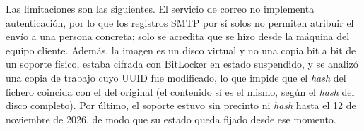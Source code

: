 Las limitaciones son las siguientes. El servicio de correo no implementa
autenticación, por lo que los registros SMTP por sí solos no permiten atribuir
el envío a una persona concreta; solo se acredita que se hizo desde la máquina
del equipo cliente. Además, la imagen es un disco virtual y no una copia bit a
bit de un soporte físico, estaba cifrada con BitLocker en estado suspendido, y
se analizó una copia de trabajo cuyo UUID fue modificado, lo que impide que el
\textit{hash} del fichero coincida con el del original (el contenido sí es el
mismo, según el \textit{hash} del disco completo). Por último, el soporte
estuvo sin precinto ni \textit{hash} hasta el 12 de noviembre de 2026, de modo
que su estado queda fijado desde ese momento.
